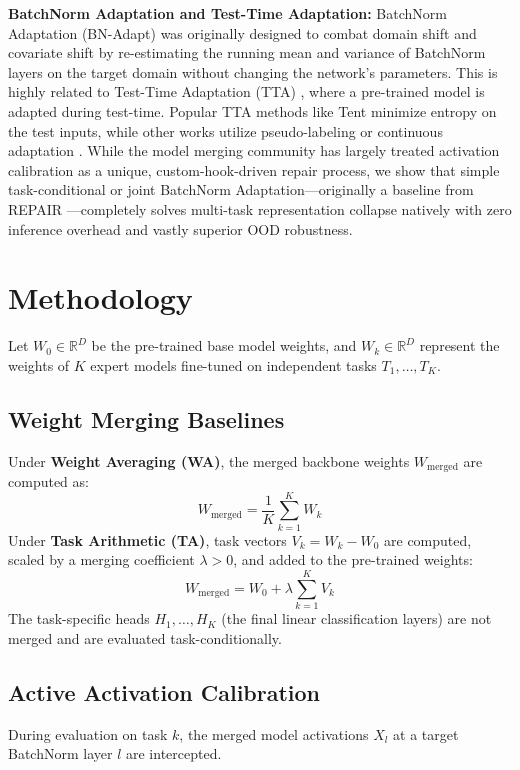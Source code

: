 \documentclass{article}
\begin{document}
\textbf{BatchNorm Adaptation and Test-Time Adaptation:} BatchNorm Adaptation (BN-Adapt) was originally designed to combat domain shift and covariate shift \cite{ioffe2015batch, liang2021robustness} by re-estimating the running mean and variance of BatchNorm layers on the target domain without changing the network's parameters. This is highly related to Test-Time Adaptation (TTA) \cite{zhang2023test}, where a pre-trained model is adapted during test-time. Popular TTA methods like Tent \cite{wang2021tent} minimize entropy on the test inputs, while other works utilize pseudo-labeling \cite{goyal2022test} or continuous adaptation \cite{niu2022efficient}. While the model merging community has largely treated activation calibration as a unique, custom-hook-driven repair process, we show that simple task-conditional or joint BatchNorm Adaptation—originally a baseline from REPAIR \cite{jordan2022repair}—completely solves multi-task representation collapse natively with zero inference overhead and vastly superior OOD robustness.

\section{Methodology}
\label{sec:method}
Let $W_0 \in \mathbb{R}^D$ be the pre-trained base model weights, and $W_k \in \mathbb{R}^D$ represent the weights of $K$ expert models fine-tuned on independent tasks $T_1, \dots, T_K$. 

\subsection{Weight Merging Baselines}
Under \textbf{Weight Averaging (WA)}, the merged backbone weights $W_{\text{merged}}$ are computed as:
\begin{equation}
    W_{\text{merged}} = \frac{1}{K} \sum_{k=1}^K W_k
\end{equation}
Under \textbf{Task Arithmetic (TA)}, task vectors $V_k = W_k - W_0$ are computed, scaled by a merging coefficient $\lambda > 0$, and added to the pre-trained weights:
\begin{equation}
    W_{\text{merged}} = W_0 + \lambda \sum_{k=1}^K V_k
\end{equation}
The task-specific heads $H_1, \dots, H_K$ (the final linear classification layers) are not merged and are evaluated task-conditionally.

\subsection{Active Activation Calibration}
During evaluation on task $k$, the merged model activations $X_l$ at a target BatchNorm layer $l$ are intercepted. 
\end{document}

